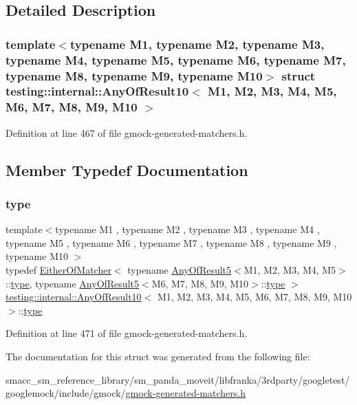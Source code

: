 \subsection{Detailed Description}
\subsubsection*{template$<$typename M1, typename M2, typename M3, typename M4, typename M5, typename M6, typename M7, typename M8, typename M9, typename M10$>$\newline
struct testing\+::internal\+::\+Any\+Of\+Result10$<$ M1, M2, M3, M4, M5, M6, M7, M8, M9, M10 $>$}



Definition at line 467 of file gmock-\/generated-\/matchers.\+h.



\subsection{Member Typedef Documentation}
\mbox{\label{structtesting_1_1internal_1_1AnyOfResult10_aa1cb3d733f29716f2015db8a2b6c1c94}} 
\subsubsection{\texorpdfstring{type}{type}}
{\footnotesize\ttfamily template$<$typename M1 , typename M2 , typename M3 , typename M4 , typename M5 , typename M6 , typename M7 , typename M8 , typename M9 , typename M10 $>$ \\
typedef \hyperlink{classtesting_1_1internal_1_1EitherOfMatcher}{Either\+Of\+Matcher}$<$ typename \hyperlink{structtesting_1_1internal_1_1AnyOfResult5}{Any\+Of\+Result5}$<$M1, M2, M3, M4, M5$>$\+::\hyperlink{structtesting_1_1internal_1_1AnyOfResult10_aa1cb3d733f29716f2015db8a2b6c1c94}{type}, typename \hyperlink{structtesting_1_1internal_1_1AnyOfResult5}{Any\+Of\+Result5}$<$M6, M7, M8, M9, M10$>$\+::\hyperlink{structtesting_1_1internal_1_1AnyOfResult10_aa1cb3d733f29716f2015db8a2b6c1c94}{type} $>$ \hyperlink{structtesting_1_1internal_1_1AnyOfResult10}{testing\+::internal\+::\+Any\+Of\+Result10}$<$ M1, M2, M3, M4, M5, M6, M7, M8, M9, M10 $>$\+::\hyperlink{structtesting_1_1internal_1_1AnyOfResult10_aa1cb3d733f29716f2015db8a2b6c1c94}{type}}



Definition at line 471 of file gmock-\/generated-\/matchers.\+h.



The documentation for this struct was generated from the following file\+:\begin{DoxyCompactItemize}
\item 
smacc\+\_\+sm\+\_\+reference\+\_\+library/sm\+\_\+panda\+\_\+moveit/libfranka/3rdparty/googletest/googlemock/include/gmock/\hyperlink{gmock-generated-matchers_8h}{gmock-\/generated-\/matchers.\+h}\end{DoxyCompactItemize}
